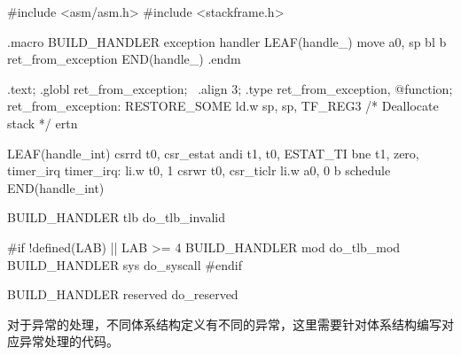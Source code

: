 \begin{CodeBlock}[language=BookLoongArch]
#include <asm/asm.h>
#include <stackframe.h>

.macro BUILD_HANDLER exception handler
LEAF(handle_\exception)
    move    a0, sp
    bl      \handler
    b       ret_from_exception
END(handle_\exception)
.endm

.text;
.globl ret_from_exception;                                                                             \
.align 3;
.type ret_from_exception, @function;
ret_from_exception:
    RESTORE_SOME
    ld.w    sp, sp, TF_REG3 /* Deallocate stack */
    ertn

LEAF(handle_int)
    csrrd   t0, csr_estat
    andi    t1, t0, ESTAT_TI
    bne     t1, zero, timer_irq
timer_irq:
    li.w    t0, 1
    csrwr   t0, csr_ticlr
    li.w    a0, 0
    b       schedule
END(handle_int)

BUILD_HANDLER tlb do_tlb_invalid

#if !defined(LAB) || LAB >= 4
BUILD_HANDLER mod do_tlb_mod
BUILD_HANDLER sys do_syscall
#endif

BUILD_HANDLER reserved do_reserved

\end{CodeBlock}

对于异常的处理，不同体系结构定义有不同的异常，这里需要针对体系结构编写对应异常处理的代码。


